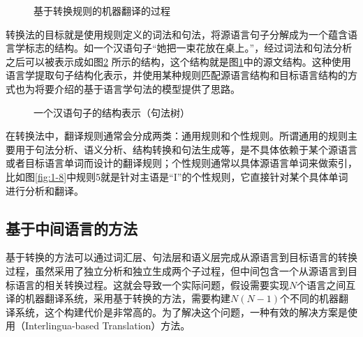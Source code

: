 \begin{figure}[htp]
    \centering

    \caption{基于转换规则的机器翻译的过程}
    \label{fig:1-10}
\end{figure}

\parinterval 转换法的目标就是使用规则定义的词法和句法，将源语言句子分解成为一个蕴含语言学标志的结构。如一个汉语句子“她把一束花放在桌上。”，经过词法和句法分析之后可以被表示成如图\ref{fig:1-11} 所示的结构，这个结构就是图\ref{fig:1-10}中的源文结构。这种使用语言学提取句子结构化表示，并使用某种规则匹配源语言结构和目标语言结构的方式也为{\chaptereight}将要介绍的基于语言学句法的模型提供了思路。

\begin{figure}[htp]
    \centering

    \caption{一个汉语句子的结构表示（句法树）}
    \label{fig:1-11}
\end{figure}

\parinterval 在转换法中，翻译规则通常会分成两类：通用规则和个性规则。所谓通用的规则主要用于句法分析、语义分析、结构转换和句法生成等，是不具体依赖于某个源语言或者目标语言单词而设计的翻译规则；个性规则通常以具体源语言单词来做索引，比如图\ref{fig:1-8}中规则5就是针对主语是“I”的个性规则，它直接针对某个具体单词进行分析和翻译。


\subsection{基于中间语言的方法}

\parinterval 基于转换的方法可以通过词汇层、句法层和语义层完成从源语言到目标语言的转换过程，虽然采用了独立分析和独立生成两个子过程，但中间包含一个从源语言到目标语言的相关转换过程。这就会导致一个实际问题，假设需要实现$N$个语言之间互译的机器翻译系统，采用基于转换的方法，需要构建$N(N-1)$个不同的机器翻译系统，这个构建代价是非常高的。为了解决这个问题，一种有效的解决方案是使用{\small{}}（Interlingua-based Translation）方法。

